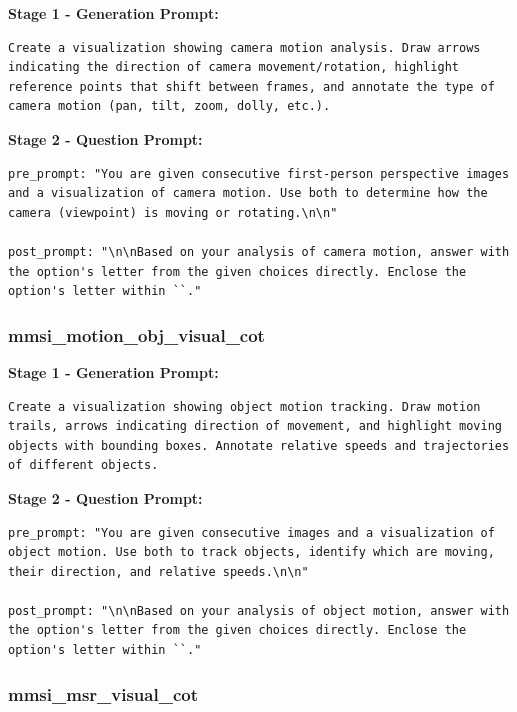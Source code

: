 \documentclass{article}
\theoremstyle{plain}
\theoremstyle{definition}
\theoremstyle{remark}
\begin{document}
\textbf{Stage 1 - Generation Prompt:}

\begin{verbatim}
Create a visualization showing camera motion analysis. Draw arrows
indicating the direction of camera movement/rotation, highlight
reference points that shift between frames, and annotate the type of
camera motion (pan, tilt, zoom, dolly, etc.).
\end{verbatim}

\textbf{Stage 2 - Question Prompt:}

\begin{verbatim}
pre_prompt: "You are given consecutive first-person perspective images
and a visualization of camera motion. Use both to determine how the
camera (viewpoint) is moving or rotating.\n\n"

post_prompt: "\n\nBased on your analysis of camera motion, answer with
the option's letter from the given choices directly. Enclose the
option's letter within ``."
\end{verbatim}

\subsubsection{mmsi\_motion\_obj\_visual\_cot}

\textbf{Stage 1 - Generation Prompt:}

\begin{verbatim}
Create a visualization showing object motion tracking. Draw motion
trails, arrows indicating direction of movement, and highlight moving
objects with bounding boxes. Annotate relative speeds and trajectories
of different objects.
\end{verbatim}

\textbf{Stage 2 - Question Prompt:}

\begin{verbatim}
pre_prompt: "You are given consecutive images and a visualization of
object motion. Use both to track objects, identify which are moving,
their direction, and relative speeds.\n\n"

post_prompt: "\n\nBased on your analysis of object motion, answer with
the option's letter from the given choices directly. Enclose the
option's letter within ``."
\end{verbatim}

\subsubsection{mmsi\_msr\_visual\_cot}
\end{document}
